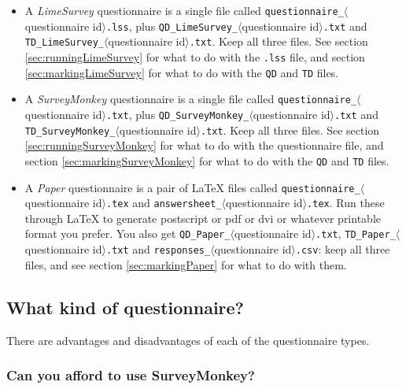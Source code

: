 \documentclass[11pt,a4paper]{article}
\newcommand{\seclabel}[1]{\label{sec:#1}}
\newcommand{\secref}[1]{section \ref{sec:#1}}
\begin{document}
\begin{itemize}
\item A \emph{LimeSurvey} questionnaire is a single file called \texttt{questionnaire\_}$\langle$questionnaire id$\rangle$\texttt{.lss}, plus 
\texttt{QD\_LimeSurvey\_}$\langle$questionnaire id$\rangle$\texttt{.txt} and \texttt{TD\_LimeSurvey\_}$\langle$questionnaire id$\rangle$\texttt{.txt}. Keep all three files. See \secref{runningLimeSurvey} for what to do with the \texttt{.lss} file, and \secref{markingLimeSurvey} for what to do with the \texttt{QD} and \texttt{TD} files.

\item A \emph{SurveyMonkey} questionnaire is a single file called \texttt{questionnaire\_}$\langle$questionnaire id$\rangle$\texttt{.txt}, plus \texttt{QD\_SurveyMonkey\_}$\langle$questionnaire id$\rangle$\texttt{.txt} and \texttt{TD\_SurveyMonkey\_}$\langle$questionnaire id$\rangle$\texttt{.txt}. Keep all three files. See \secref{runningSurveyMonkey} for what to do with the questionnaire file, and \secref{markingSurveyMonkey} for what to do with the \texttt{QD} and \texttt{TD} files.

\item A \emph{Paper} questionnaire is a pair of \LaTeX{} files called \texttt{questionnaire\_}$\langle$questionnaire id$\rangle$\texttt{.tex} and \texttt{answersheet\_}$\langle$questionnaire id$\rangle$\texttt{.tex}. Run these through \LaTeX{} to generate postscript or pdf or dvi or whatever printable format you prefer. You also get \texttt{QD\_Paper\_}$\langle$questionnaire id$\rangle$\texttt{.txt}, \texttt{TD\_Paper\_}$\langle$questionnaire id$\rangle$\texttt{.txt} and \texttt{responses\_}$\langle$questionnaire id$\rangle$\texttt{.csv}: keep all three files, and see \secref{markingPaper} for what to do with them.
\end{itemize}

\subsection{What kind of questionnaire?}
\seclabel{choosingquestionnairetype}

There are advantages and disadvantages of each of the questionnaire types. 

\subsubsection{Can you afford to use SurveyMonkey?}
\seclabel{surveymonkeycosts}
\end{document}
